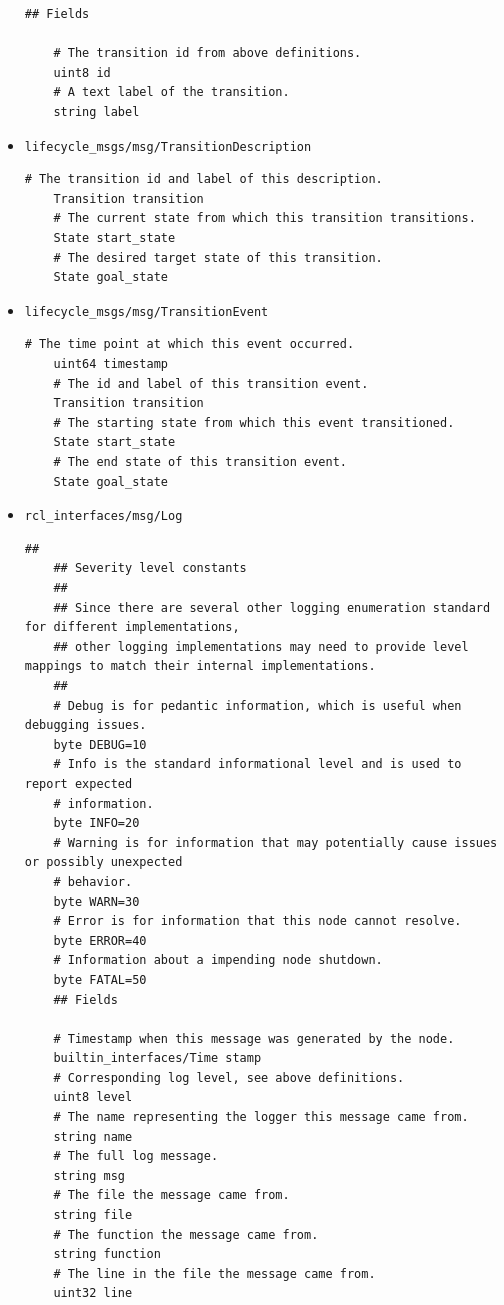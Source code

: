 \begin{itemize}
\begin{lstlisting}[language=msg,
	caption={Message definition Transition}]
	## Fields

	# The transition id from above definitions.
	uint8 id
	# A text label of the transition.
	string label
\end{lstlisting}

\item \lstinline{lifecycle_msgs/msg/TransitionDescription}
\begin{lstlisting}[language=msg,
	caption={Message definition TransitionDescription}]
	# The transition id and label of this description.
	Transition transition
	# The current state from which this transition transitions.
	State start_state
	# The desired target state of this transition.
	State goal_state
\end{lstlisting}

\item \lstinline{lifecycle_msgs/msg/TransitionEvent}
\begin{lstlisting}[language=msg,
	caption={Message definition TransitionEvent}]
	# The time point at which this event occurred.
	uint64 timestamp
	# The id and label of this transition event.
	Transition transition
	# The starting state from which this event transitioned.
	State start_state
	# The end state of this transition event.
	State goal_state
\end{lstlisting}

\item \lstinline{rcl_interfaces/msg/Log}
\begin{lstlisting}[language=msg,
	label={code:ROS:Message definition Log},
	caption={Message definition Log}]
	##
	## Severity level constants
	## 
	## Since there are several other logging enumeration standard for different implementations,
	## other logging implementations may need to provide level mappings to match their internal implementations.
	##
	# Debug is for pedantic information, which is useful when debugging issues.
	byte DEBUG=10
	# Info is the standard informational level and is used to report expected
	# information.
	byte INFO=20
	# Warning is for information that may potentially cause issues or possibly unexpected
	# behavior.
	byte WARN=30
	# Error is for information that this node cannot resolve.
	byte ERROR=40
	# Information about a impending node shutdown.
	byte FATAL=50
	## Fields

	# Timestamp when this message was generated by the node.
	builtin_interfaces/Time stamp
	# Corresponding log level, see above definitions.
	uint8 level
	# The name representing the logger this message came from.
	string name
	# The full log message.
	string msg
	# The file the message came from.
	string file
	# The function the message came from.
	string function
	# The line in the file the message came from.
	uint32 line
\end{lstlisting}

\end{itemize}

